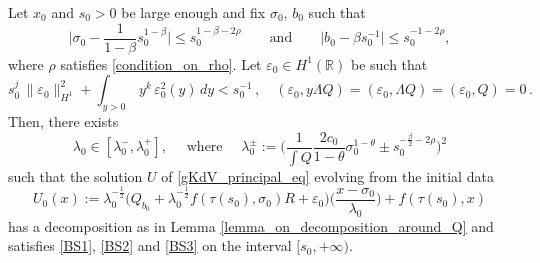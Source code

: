 \documentclass[10pt,a4paper]{amsart}
\newcommand{\RR}{\mathbb{R}}
\newcommand{\vare}{{\varepsilon}}
\begin{document}
\begin{proposition}\label{Prop_on_blow_up}
Let $x_0$ and $s_0>0$ be large enough and fix $\sigma_0$, $b_0$ such that
\begin{equation}\label{init_cond_sigma_b}
    \Big\lvert \sigma_0 - \frac{1}{1-\beta}s^{1-\beta}_0 \Big\rvert \leq s_0^{1-\beta-2\rho} \qquad \text{and} \qquad \Big\lvert b_0 - \beta s_0^{-1} \Big\rvert \leq s_0^{-1-2\rho},
\end{equation}
where $\rho $ satisfies \eqref{condition_on_rho}.
Let $\vare_0 \in H^1(\RR)$ be such that 
\begin{equation}\label{conditons_ortho_and_decroissance_on_vare_0}
s_0^{j} \, \|\varepsilon_0\|^2_{H^1} +  \int_{y>0} \, y^k \, \varepsilon^2_0(y)\, dy < s_0^{-1}\, , \quad (\varepsilon_0,y\Lambda Q) = (\varepsilon_0, \Lambda Q) = (\varepsilon_0, Q) = 0\, .
\end{equation} 
    Then, there exists 
    \begin{equation}\label{init_cond_in_BS}
        \lambda_0 \in [\lambda^-_0,\lambda^+_0], \quad \text{ where } \quad \lambda^{\pm}_0 := \Big( \frac{1}{\int Q}\frac{2 c_0}{1-\theta} \sigma^{1-\theta}_0
        \pm s^{-\frac{\beta}{2}-2\rho}_0 \Big)^2
    \end{equation}
such that the solution $U$ of \eqref{gKdV_principal_eq} evolving from the initial data
\begin{equation}
    U_0(x):= \lambda_0^{-\frac{1}{2}}\Big( Q_{b_0}+\lambda_0^{-\frac{1}{2}}f(\tau(s_0),\sigma_0)R + \vare_0 \Big)\Big( \frac{x-\sigma_0}{\lambda_0}\Big) + f(\tau(s_0),x)
\end{equation}
has a decomposition as in Lemma \ref{lemma_on_decomposition_around_Q} and satisfies \eqref{BS1}, \eqref{BS2} and \eqref{BS3} on the interval $[s_0,+\infty)$.
\end{proposition}
\end{document}
